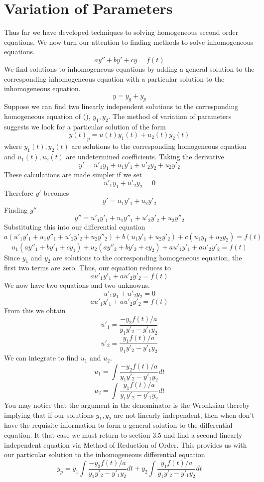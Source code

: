 \section{Variation of Parameters}
Thus far we have developed techniques to solving homogeneous second order equations. We now turn our attention to finding methods to solve inhomogeneous equations.
\[ay''+by'+cy = f(t)\]
We find solutions to inhomogeneous equations by adding a general solution to the corresponding inhomogeneous equation with a particular solution to the inhomogeneous equation. 
\[y = y_g + y_p\]
Suppose we can find two linearly independent solutions to the corresponding homogeneous equation of (), $y_1, y_2$. The method of variation of parameters suggests we look for a particular solution of the form
\[y(t)_p = u(t)y_1(t)+u_2(t)y_2(t)\]
where $y_1(t), y_2(t)$ are solutions to the corresponding homogeneous equation and $u_1(t), u_2(t)$ are undetermined coefficients. 
Taking the derivative
\[y' = u'_1y_1+u_1y'_1 + u'_2y_2+u_2y'_2\]
These calculations are made simpler if we set 
\[u'_1y_1 + u'_2y_2 = 0 \]
Therefore $y'$ becomes
\[y' = u_1y'_1 + u_2y'_2 \]
Finding $y''$
\[y'' = u'_1y'_1 + u_1y''_1 + u'_2y'_2+u_2y''_2\]
Substituting this into our differential equation
\[a(u'_1y'_1 + u_1y''_1 + u'_2y'_2+u_2y''_2)+ b(u_1y'_1 + u_2y'_2 )+c(u_1y_1 + u_2y_2) = f(t)\]
\[u_1(ay''_1 + by'_1+cy_1) + u_2(ay''_2 + by'_2+cy_2) + au'_1y'_1+au'_2y'_2 = f(t) \]
Since $y_1$ and $y_2$ are solutions to the corresponding homogeneous equation, the first two terms are zero. Thus, our equation reduces to
\[au'_1y'_1+au'_2y'_2 = f(t)\]
We now have two equations and two unknowns.
\[u'_1y_1 + u'_2y_2 = 0 \]
\[au'_1y'_1+au'_2y'_2 = f(t)\]
From this we obtain
\[u'_1 = \frac{-y_2f(t)/a}{y_1y'_2 - y'_1y_2}\]
\[u'_2 = \frac{y_1f(t)/a}{y_1y'_2 - y'_1y_2}\]
We can integrate to find $u_1$ and $u_2$.
\[u_1 = \int \frac{-y_2f(t)/a}{y_1y'_2 - y'_1y_2} dt\]
\[u_2 = \int \frac{y_1f(t)/a}{y_1y'_2 - y'_1y_2} dt \]
You may notice that the argument in the denominator is the Wronksian thereby implying that if our solutions $y_1, y_2$ are not linearly independent, then when don't have the requisite information to form a general solution to the differential equation. It that case we must return to section 3.5 and find a second linearly independent equation via Method of Reduction of Order. 
\linebreak
\linebreak
This provides us with our particular solution to the inhomogeneous differential equation
\[y_p = y_1\int \frac{-y_2f(t)/a}{y_1y'_2 - y'_1y_2} dt + y_2\int \frac{y_1f(t)/a}{y_1y'_2 - y'_1y_2} dt\]




